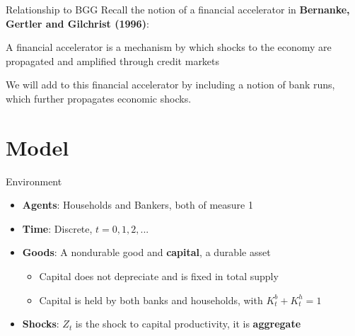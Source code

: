 \documentclass[
	11pt, %
	aspectratio=169, %
]{beamer}
\begin{document}
\begin{frame}{Relationship to BGG}
    Recall the notion of a financial accelerator in \textbf{Bernanke, Gertler and Gilchrist (1996)}:
    \begin{Definition}
        A financial accelerator is a mechanism by which shocks to the economy are propagated and amplified through credit markets
    \end{Definition}
    We will add to this financial accelerator by including a notion of bank runs, which further propagates economic shocks.
\end{frame}
\section{Model}
\begin{frame}{Environment}
    \begin{itemize}
        \item \textbf{Agents}: Households and Bankers, both of measure 1
        \item \textbf{Time}: Discrete, $t=0,1,2,...$
        \item \textbf{Goods}: A nondurable good and \textbf{capital}, a durable asset
        \begin{itemize}
            \item Capital does not depreciate and is fixed in total supply
            \item Capital is held by both banks and households, with $K_t^b+K_t^h=1$
        \end{itemize}
        \item \textbf{Shocks}: $Z_t$ is the shock to capital productivity, it is \textbf{aggregate}
    \end{itemize}
\end{frame}
\end{document}
